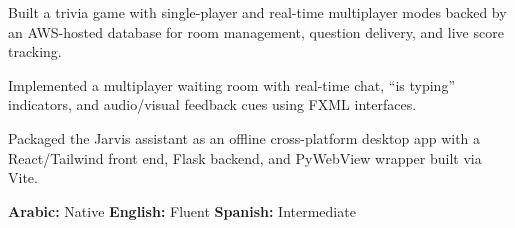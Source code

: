 \documentclass[a4paper,10pt]{article}
\begin{document}
\begin{cvitems}
  \item Built a trivia game with single-player and real-time multiplayer modes
        backed by an AWS-hosted database for room management, question delivery,
        and live score tracking.
  \item Implemented a multiplayer waiting room with real-time chat, ``is typing''
        indicators, and audio/visual feedback cues using FXML interfaces.
\end{cvitems}

\begin{cvitems}
  \item Packaged the Jarvis assistant as an offline cross-platform desktop app
        with a React/Tailwind front end, Flask backend, and PyWebView wrapper
        built via Vite.
\end{cvitems}




\textbf{Arabic:} Native \hspace{1.5em} \textbf{English:} Fluent \hspace{1.5em} \textbf{Spanish:} Intermediate
\end{document}
